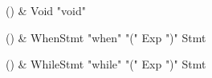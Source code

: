 \begin{bbgrammarappendix}{4.6in}

() & Void \label{prod:Void}  \: \xcd"void"  \\


\end{bbgrammarappendix}

\begin{bbgrammarappendix}{4.2in}

() & WhenStmt \label{prod:WhenStmt}  \: \xcd"when" \xcd"(" Exp \xcd")" Stmt  \\


\end{bbgrammarappendix}

\begin{bbgrammarappendix}{4.1in}

() & WhileStmt \label{prod:WhileStmt}  \: \xcd"while" \xcd"(" Exp \xcd")" Stmt  \\


\end{bbgrammarappendix}
